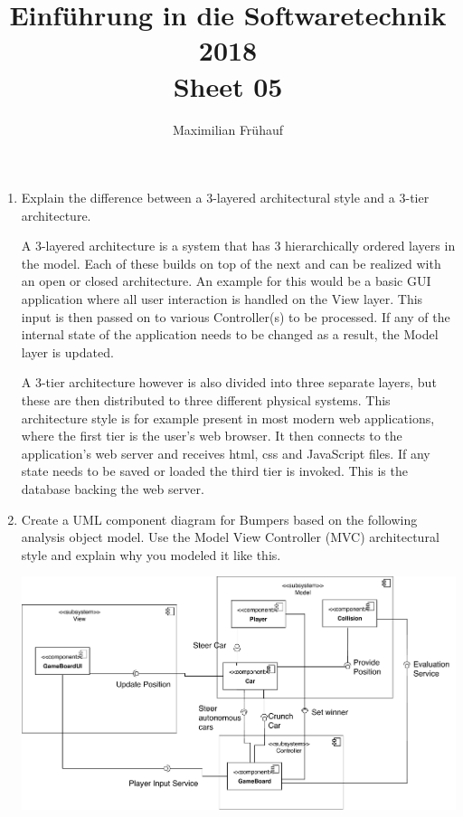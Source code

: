 \documentclass[a4paper, 10pt]{article}
\title{Einführung in die Softwaretechnik 2018 \\ Sheet 05}
\author{Maximilian Frühauf}
\begin{document}
\maketitle
\begin{enumerate}
    \item
    Explain the difference between a 3-layered architectural style and a 3-tier architecture.
    \vspace{0.5cm}

    A 3-layered architecture is a system that has 3 hierarchically ordered layers in the model.
    Each of these builds on top of the next and can be realized with an open or closed architecture.
    An example for this would be a basic GUI application where all user interaction is handled on the 
    View layer. This input is then passed on to various Controller(s) to be processed. If any of the 
    internal state of the application needs to be changed as a result, the Model layer is updated.



    A 3-tier architecture however is also divided into three separate layers, but these are then 
    distributed to three different physical systems.
    This architecture style is for example present in most modern web applications, where the first 
    tier is the user's web browser. It then connects to the application's web server and 
    receives html, css and JavaScript files. If any state needs to be saved or loaded the 
    third tier is invoked. This is the database backing the web server.
    \item
    Create a UML component diagram for Bumpers based on the following analysis object model. 
    Use the Model View Controller (MVC) architectural style and explain why you modeled it like this.
    \vspace{0.5cm}
    
    \includegraphics[width=\linewidth]{task2.pdf}


\end{enumerate}
\end{document}
